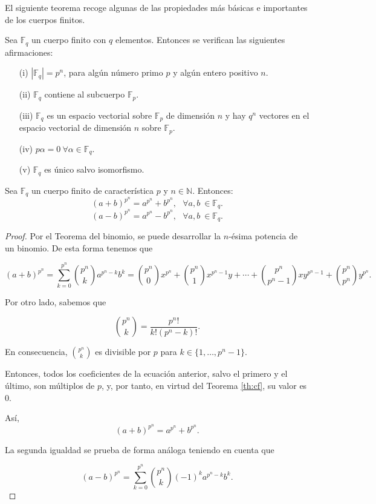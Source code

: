 El siguiente teorema recoge algunas de las propiedades más básicas e importantes de los cuerpos finitos.

\begin{teorema}\label{th:cf}
    Sea $\mathbb{F}_q$ un cuerpo finito con $q$ elementos. Entonces se verifican las siguientes afirmaciones:
    \begin{enumerate}
        \item[(i)] $|\mathbb{F}_q| = p^n$, para algún número primo $p$ y algún entero positivo $n$.
        \item[(ii)]  $\mathbb{F}_q$ contiene al subcuerpo $\mathbb{F}_p$.
        \item[(iii)] $\mathbb{F}_q$ es un espacio vectorial sobre $\mathbb{F}_p$ de dimensión $n$ y hay $q^n$ vectores en el espacio vectorial de dimensión $n$ sobre $\mathbb{F}_p$.
        \item[(iv)]  $p\alpha = 0 \ \forall \alpha \in \mathbb{F}_q$.
        \item[(v)] $\mathbb{F}_q$ es único salvo isomorfismo. 
    \end{enumerate}
\end{teorema}

\begin{proposicion}\label{prop:bin}
    Sea $\mathbb{F}_q$ un cuerpo finito de característica $p$ y $n \in \mathds{N}$. Entonces: $$(a + b)^{p^{n}} = a^{p^{n}} + b^{p^{n}}, \ \ \ \forall a, b \ \in \mathbb{F}_q.$$
    $$(a - b)^{p^{n}} = a^{p^{n}} - b^{p^{n}}, \ \ \ \forall a, b \ \in \mathbb{F}_q.$$
\end{proposicion}

\begin{proof}

Por el Teorema del binomio, se puede desarrollar la $n$-ésima potencia de un binomio. De esta forma tenemos que 

\begin{equation}
\label{eq:bin}
    (a + b)^{p^{n}} =  \sum_{k=0}^{p^{n}} \binom{p^n}{k}a^{p^n-k}b^k = \binom{p^n}{0}x^{p^n} + \binom{p^n}{1}x^{p^n-1}y + \cdots + \binom{p^n}{p^n-1} xy^{p^n-1} + \binom{p^n}{p^n}y^{p^n}.
\end{equation}

Por otro lado, sabemos que 

\begin{equation}
    \binom{p^n}{k} = \frac{p^n!}{k!(p^n-k)!}.
\end{equation}

En consecuencia, $\binom{p^n}{k}$ es divisible por $p$ para $k \in \{1,\dots,p^n-1\}$.

Entonces, todos los coeficientes de la ecuación anterior, salvo el primero y el último, son múltiplos de $p$, y, por tanto, en virtud del Teorema \ref{th:cf}, su valor es $0$.

Así, $$(a + b)^{p^{n}} = a^{p^{n}} + b^{p^{n}}.$$

La segunda igualdad se prueba de forma análoga teniendo en cuenta que 

\begin{equation}
    (a - b)^{p^{n}} =  \sum_{k=0}^{p^{n}} \binom{p^n}{k}(-1)^ka^{p^n-k}b^k.
\end{equation}
\end{proof}

